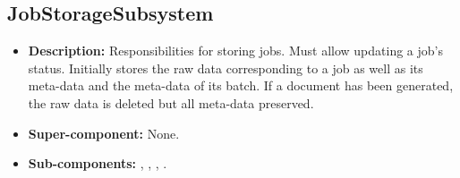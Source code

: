 \subsection{JobStorageSubsystem}
\begin{itemize}
    \item \textbf{Description:} Responsibilities for storing jobs. Must allow updating a job's status. Initially stores the raw data corresponding to a job as well as its meta-data and the meta-data of its batch. If a document has been generated, the raw data is deleted but all meta-data preserved.
    \item \textbf{Super-component:} None.
    \item \textbf{Sub-components:} , , , .
\end{itemize}

